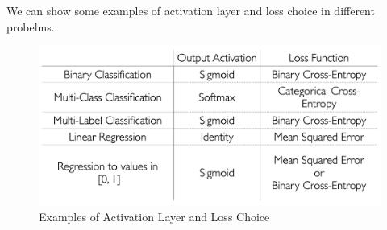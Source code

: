 \documentclass[11pt,a4paper]{article}
\begin{document}
We can show some examples of activation layer and loss choice in different probelms.
\begin{center}\begin{figure}[htbp]
    \centering
    \includegraphics[scale=0.15]{exampleofact.png}
    \caption{Examples of Activation Layer and Loss Choice}
    \label{}
\end{figure}\end{center}
\end{document}
